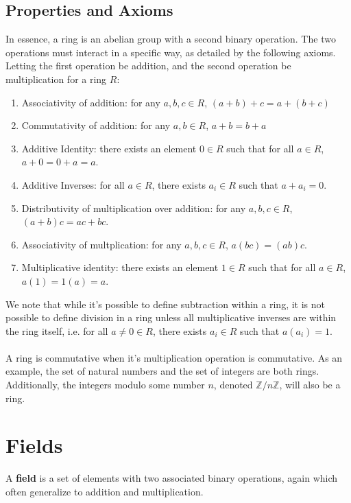 \documentclass[11pt]{report}
\newcommand{\Z}{\mathbb{Z}}
\begin{document}
\subsection{Properties and Axioms}
In essence, a ring is an abelian group with a second binary operation. The two operations must interact in a specific way, as detailed by the following axioms. Letting the first operation be addition, and the second operation be multiplication for a ring $R$:
\begin{enumerate}
\item Associativity of addition: for any $a,b,c \in R$, $(a+b)+c = a+(b+c)$
\item Commutativity of addition: for any $a,b \in R$, $a+b = b+a$
\item Additive Identity: there exists an element $0 \in R$ such that for all $a \in R$, $a + 0 = 0 + a = a$.
\item Additive Inverses: for all $a \in R$, there exists $a_i \in R$ such that $a + a_i = 0$.
\item Distributivity of multiplication over addition: for any $a,b,c \in R$, $(a+b)c = ac + bc$.
\item Associativity of multplication: for any $a,b,c \in R$, $a(bc)=(ab)c$.
\item Multiplicative identity: there exists an element $1 \in R$ such that for all $a \in R$, $a(1) = 1(a) = a$.
\end{enumerate}
We note that while it's possible to define subtraction within a ring, it is not possible to define division in a ring unless all multiplicative inverses are within the ring itself, i.e. for all $a \ne 0 \in R$, there exists $a_i \in R$ such that $a(a_i) = 1$.
\\ \\
A ring is commutative when it's multiplication operation is commutative. As an example, the set of natural numbers and the set of integers are both rings. Additionally, the integers modulo some number $n$, denoted $\Z/n\Z$, will also be a ring.
\section{Fields}
A \textbf{field} is a set of elements with two associated binary operations, again which often generalize to addition and multiplication.
\end{document}
